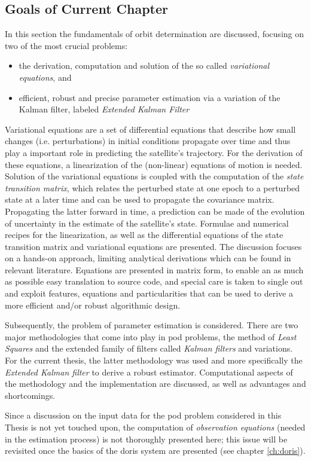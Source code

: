 \subsection{Goals of Current Chapter}\label{ssec:pod-goals}
In this section the fundamentals of orbit determination are discussed, focusing on 
two of the most crucial problems:
\begin{itemize}[noitemsep]
  \item the derivation, computation and solution of the so called \emph{variational equations}, and 
  \item efficient, robust and precise parameter estimation via a variation of the 
    Kalman filter, labeled \emph{Extended Kalman Filter}
\end{itemize}

Variational equations are a set of differential equations that describe how small changes 
(i.e. perturbations) in initial conditions propagate over time and thus play a important 
role in predicting the satellite's trajectory. For the derivation of these equations, 
a linearization of the (non-linear) equations of motion is needed. Solution of the 
variational equations is coupled with the computation of the \emph{state transition matrix}, 
which relates the perturbed state at one epoch to a perturbed state at a later time and 
can be used to propagate the covariance matrix. Propagating the latter forward in time, 
a prediction can be made of the evolution of uncertainty in the estimate of the satellite's 
state. Formulae and numerical recipes for the linearization, as well as the differential 
equations of the state transition matrix and variational equations are presented. 
The discussion focuses on a hands-on approach, limiting analytical derivations which can be 
found in relevant literature. Equations are presented in matrix form, to enable an 
as much as possible easy translation to source code, and special care is taken to 
single out and exploit features, equations and particularities that can be used to derive 
a more efficient and/or robust algorithmic design.

Subsequently, the problem of parameter estimation is considered. There are two major 
methodologies that come into play in \gls{pod} problems, the method of \emph{Least Squares} 
and the extended family of filters called \emph{Kalman filters} and variations. 
For the current thesis, the latter methodology was used and more specifically the 
\emph{Extended Kalman filter} to derive a robust estimator. Computational aspects of the 
methodology and the implementation are discussed, as well as advantages and shortcomings.

Since a discussion on the input data for the \gls{pod} problem considered in this Thesis 
is not yet touched upon, the computation of \emph{observation equations} (needed in the 
estimation process) is not thoroughly presented here; this issue will be revisited once the 
basics of the \gls{doris} system are presented (see chapter \autoref{ch:doris}).
